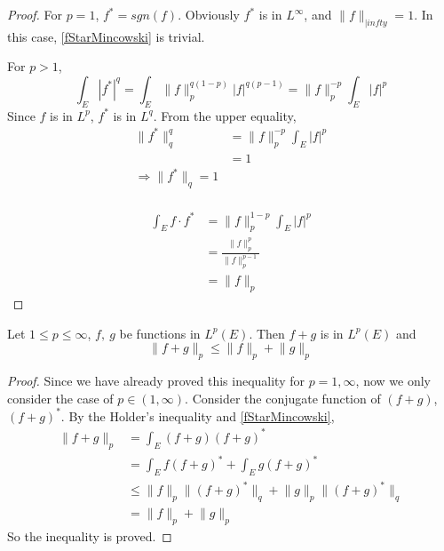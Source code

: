 \documentclass[lang=en, 12pt]{elegantbook}
\begin{document}
        \begin{proof}
            For $p = 1$, $f^*= sgn(f)$. Obviously $f^*$ is in $L^{\infty}$,
        and $\lVert f\rVert_{|infty} = 1$. In this case, \eqref{fStarMincowski}
        is  trivial. \par
            For $p > 1 $,
            $$\int_E |f^*|^q = \int_E \lVert f \rVert_p^{q(1-p)}
            |f|^{q(p-1)} = \lVert f \rVert_p^{-p} \int_E |f|^p$$
            Since $f$ is in $L^p$, $f^*$ is in $L^q$. From the 
        upper equality,
        \begin{equation*}
            \begin{aligned}
                \lVert f^* \rVert_q^q &= \lVert f \rVert_p^{-p} \int_E |f|^p\\\
            &= 1\\
            \Rightarrow \lVert f^* \rVert_q = 1\\    
            \end{aligned}
        \end{equation*}
            \par
            \begin{equation*}
                \begin{aligned}
                    \int_E f \cdot f^* &= \lVert f \rVert_p^{1-p} 
                    \int_E |f|^{p}\\
                    &=  \frac{\lVert f \rVert_p^{p}}{\lVert f \rVert_p^{p-1}}\\
                    &= \lVert f \rVert_p
                \end{aligned}
            \end{equation*}
        \end{proof}
        \begin{theorem}
            Let $1\leq p\leq \infty$, $f, \ g$ be functions in $L^p(E)$. Then $f+g$ is in $L^p(E)$ and
            \begin{equation}\label{MincowskiInequality}
                \lVert f + g\rVert_p \leq \lVert f \rVert_p +\lVert g \rVert_p
            \end{equation}
        \end{theorem}
        \begin{proof}
            Since we have already proved this inequality for $p= 1 ,\infty$,
        now we only consider the case of $p \in (1, \infty)$.
        Consider the conjugate function of $(f+g)$, $(f+g)^*$.
        By the Holder's inequality and \eqref{fStarMincowski},
        \begin{equation*}
            \begin{aligned}
                \lVert f+g \rVert_p &= \int_E (f+g)(f+g)^*\\
                &=\int_E f(f+g)^* +\int_E g(f+g)^*\\
                &\leq \lVert f \rVert_p \lVert( f +g )^*\rVert_q +
                \lVert g \rVert_p \lVert( f +g )^*\rVert_q\\
                &=  \lVert f \rVert_p  + \lVert g\rVert_p
            \end{aligned}
        \end{equation*}
        So the inequality is proved.
        \end{proof}
\end{document}
